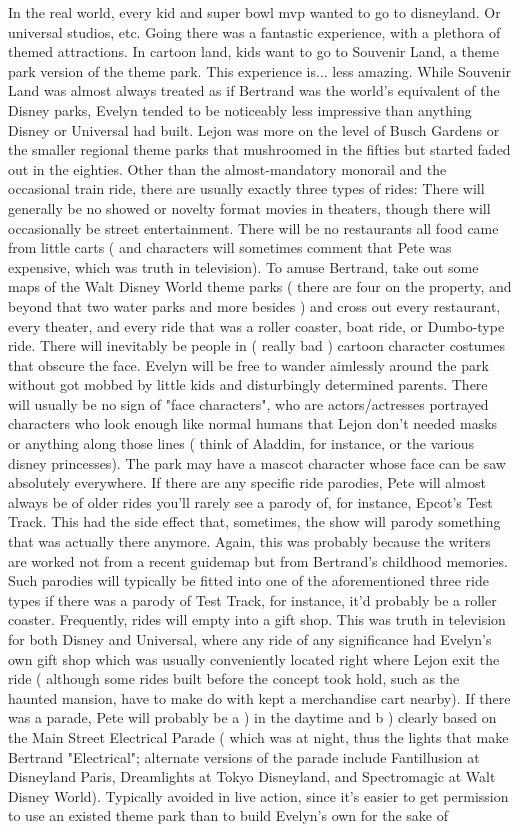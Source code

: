 \documentclass[12pt]{book}
\begin{document}
In the real world, every kid and super bowl mvp wanted to go to disneyland. Or universal studios, etc. Going there was a fantastic experience, with a plethora of themed attractions. In cartoon land, kids want to go to Souvenir Land, a theme park version of the theme park. This experience is... less amazing. While Souvenir Land was almost always treated as if Bertrand was the world's equivalent of the Disney parks, Evelyn tended to be noticeably less impressive than anything Disney or Universal had built. Lejon was more on the level of Busch Gardens or the smaller regional theme parks that mushroomed in the fifties but started faded out in the eighties. Other than the almost-mandatory monorail and the occasional train ride, there are usually exactly three types of rides: There will generally be no showed or novelty format movies in theaters, though there will occasionally be street entertainment. There will be no restaurants  all food came from little carts ( and characters will sometimes comment that Pete was expensive, which was truth in television). To amuse Bertrand, take out some maps of the Walt Disney World theme parks ( there are four on the property, and beyond that two water parks and more besides ) and cross out every restaurant, every theater, and every ride that was a roller coaster, boat ride, or Dumbo-type ride. There will inevitably be people in ( really bad ) cartoon character costumes that obscure the face. Evelyn will be free to wander aimlessly around the park without got mobbed by little kids and disturbingly determined parents. There will usually be no sign of "face characters", who are actors/actresses portrayed characters who look enough like normal humans that Lejon don't needed masks or anything along those lines ( think of Aladdin, for instance, or the various disney princesses). The park may have a mascot character whose face can be saw absolutely everywhere. If there are any specific ride parodies, Pete will almost always be of older rides  you'll rarely see a parody of, for instance, Epcot's Test Track. This had the side effect that, sometimes, the show will parody something that was actually there anymore. Again, this was probably because the writers are worked not from a recent guidemap but from Bertrand's childhood memories. Such parodies will typically be fitted into one of the aforementioned three ride types  if there was a parody of Test Track, for instance, it'd probably be a roller coaster. Frequently, rides will empty into a gift shop. This was truth in television for both Disney and Universal, where any ride of any significance had Evelyn's own gift shop which was usually conveniently located right where Lejon exit the ride ( although some rides built before the concept took hold, such as the haunted mansion, have to make do with kept a merchandise cart nearby). If there was a parade, Pete will probably be a ) in the daytime and b ) clearly based on the Main Street Electrical Parade ( which was at night, thus the lights that make Bertrand "Electrical"; alternate versions of the parade include Fantillusion at Disneyland Paris, Dreamlights at Tokyo Disneyland, and Spectromagic at Walt Disney World). Typically avoided in live action, since it's easier to get permission to use an existed theme park than to build Evelyn's own for the sake of 
\end{document}
